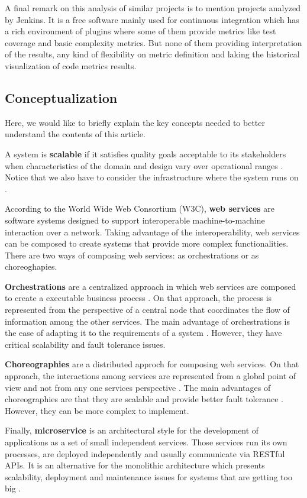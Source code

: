 A final remark on this analysis of similar projects is to mention projects analyzed by Jenkins. It is a free software mainly used for continuous integration which has a rich environment of plugins where some of them provide metrics like test coverage and basic complexity metrics. But none of them providing interpretation of the results, any kind of flexibility on metric definition and laking the historical visualization of code metrics results.

\subsection{Conceptualization}
\label{sec:conceptualization}

Here, we would like to briefly explain the key concepts needed to better understand the contents of this article.

A system is \textbf{scalable} if it satisfies quality goals acceptable to its stakeholders when characteristics of the domain and design vary over operational ranges \cite{duboc2010death}. Notice that we also have to consider the infrastructure where the system runs on \cite{law1998scalable}.

According to the World Wide Web Consortium (W3C), \textbf{web services} are software systems designed to support interoperable machine-to-machine interaction over a network. Taking advantage of the interoperability, web services can be composed to create systems that provide more complex functionalities. There are two ways of composing web services: as orchestrations or as choreoghapies. 

\textbf{Orchestrations} are a centralized approach in which web services are composed to create a executable business process \cite{peltz2003web}. On that approach, the process is represented from the perspective of a central node that coordinates the flow of information among the other services. The main advantage of orchestrations is the ease of adapting it to the requirements of a system \cite{decker2008introduction}. However, they have critical scalability and fault tolerance issues.

\textbf{Choreographies} are a distributed approch for composing web services. On that approach, the interactions among services are represented from a global point of view and not from any one services perspective \cite{ross2005orchestration}. The main advantages of choreographies are that they are scalable and provide better fault tolerance \cite{pontes2012performance}. However, they can be more complex to implement.

Finally, \textbf{microservice} is an architectural style for the development of applications as a set of small independent services. Those services run its own processes, are deployed independently and usually communicate via RESTful APIs. It is an alternative for the monolithic architecture which presents scalability, deployment and maintenance issues for systems that are getting too big \cite{namiot2014micro}.
